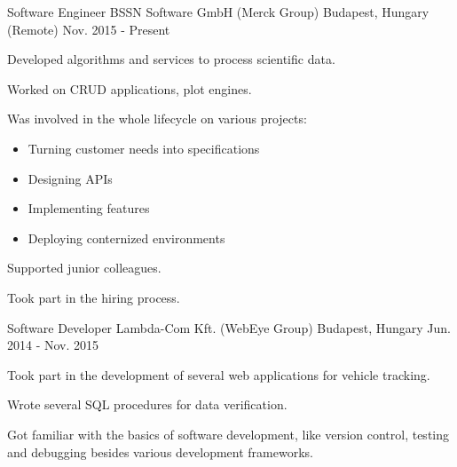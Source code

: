 

\begin{cventries}

  \cventry
    {Software Engineer} %
    {BSSN Software GmbH (Merck Group)} %
    {Budapest, Hungary (Remote)} %
    {Nov. 2015 - Present} %
    {
      \begin{cvitems} %
        \item {Developed algorithms and services to process scientific data.}
		\item {Worked on CRUD applications, plot engines.}
        \item {Was involved in the whole lifecycle on various projects:
		 \begin{itemize} %
		  \item {Turning customer needs into specifications}
		  \item {Designing APIs}
          \item {Implementing features}
          \item {Deploying conternized environments}
		 \end{itemize}}
		\item {Supported junior colleagues.}
		\item {Took part in the hiring process.}
      \end{cvitems}
    }

  \cventry
    {Software Developer} %
    {Lambda-Com Kft. (WebEye Group)} %
    {Budapest, Hungary} %
    {Jun. 2014 - Nov. 2015} %
    {
      \begin{cvitems} %
        \item {Took part in the development of several web applications for vehicle tracking.}
		\item {Wrote several SQL procedures for data verification.}
        \item {Got familiar with the basics of software development, like version control, testing and debugging besides various development frameworks.}
      \end{cvitems}
    }

\end{cventries}
